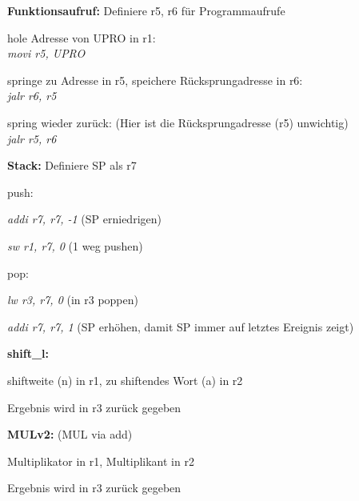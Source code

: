 \documentclass[fleqn, a4paper, 11pt]{article}       %
\begin{document}
 \noindent \textbf{Funktionsaufruf:}
     Definiere r5, r6 für Programmaufrufe
     \begin{compactenum}
     \item hole Adresse von UPRO in r1:\\
         \emph{movi r5, UPRO} 
     \item springe zu Adresse in r5, speichere Rücksprungadresse in r6:\\
         \emph{jalr r6, r5}
     \item spring wieder zurück: (Hier ist die Rücksprungadresse (r5) unwichtig)\\
         \emph{jalr r5, r6 }
     \end{compactenum}
         
 \noindent \textbf{Stack:}
     Definiere SP als r7
     \begin{compactitem}
         \item push:
         \begin {compactitem}
                  \item \emph{addi r7, r7, -1}           (SP erniedrigen)
                   \item \emph{sw  r1, r7, 0 }            (1 weg pushen)
           \end{compactitem}         
         \item pop:
             \begin{compactitem}
                   \item \emph{lw r3, r7, 0 }             (in r3 poppen) 
                   \item \emph{addi r7, r7, 1  }          (SP erhöhen, damit SP immer auf letztes Ereignis zeigt)
             \end{compactitem}                                 
         \end{compactitem}  
         
 \noindent \textbf{shift\_l:}
 \begin{compactitem}
     \item shiftweite (n) in r1, zu shiftendes Wort (a) in r2
     \item Ergebnis wird in r3 zurück gegeben
     \end{compactitem}
    
 \noindent \textbf{MULv2:}  (MUL via add)
 \begin{compactitem}
     \item Multiplikator in r1, Multiplikant in r2
     \item Ergebnis wird in r3 zurück gegeben
     \end{compactitem}
   
\end{document}
